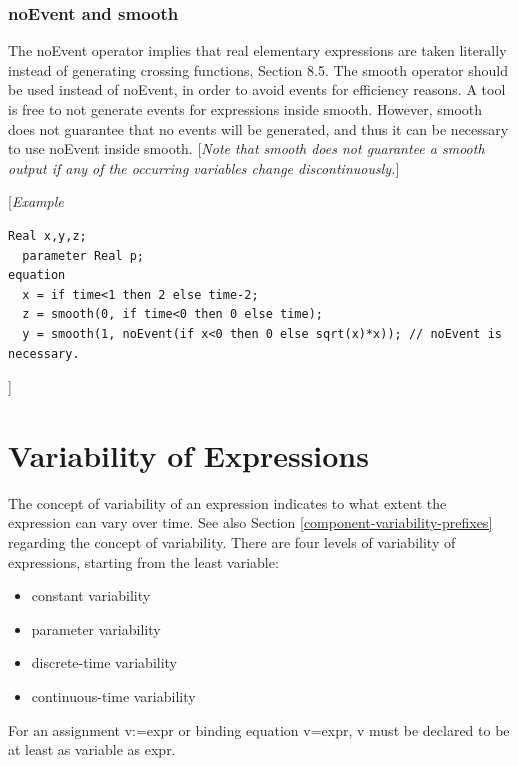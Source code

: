 \documentclass[10pt,a4paper]{report}
\def\Mcomment#1{{[}\emph{#1}{]}}
\def\Mcommentbegin#1{{[}\emph{#1}}
\def\Mcommentend#1{\emph{#1}{]}}
\def\doublelabel#1{\label{#1}\hypertarget{#1}{}}
\begin{document}
\subsubsection{noEvent and smooth}\doublelabel{noevent-and-smooth}

The noEvent operator implies that real elementary expressions are taken
literally instead of generating crossing functions, Section 8.5. The
smooth operator should be used instead of noEvent, in order to avoid
events for efficiency reasons. A tool is free to not generate events for
expressions inside smooth. However, smooth does not guarantee that no
events will be generated, and thus it can be necessary to use noEvent
inside smooth. \Mcomment{Note that \emph{smooth} does not guarantee a
smooth output if any of the occurring variables change
discontinuously.}

\Mcommentbegin{Example}
\begin{lstlisting}[language=modelica]
  Real x,y,z;
  parameter Real p;
equation
  x = if time<1 then 2 else time-2;
  z = smooth(0, if time<0 then 0 else time);
  y = smooth(1, noEvent(if x<0 then 0 else sqrt(x)*x)); // noEvent is necessary.
\end{lstlisting}
\Mcommentend{}

\section{Variability of Expressions}\doublelabel{variability-of-expressions}

The concept of variability of an expression indicates to what extent the
expression can vary over time. See also Section \ref{component-variability-prefixes} regarding the
concept of variability. There are four levels of variability of
expressions, starting from the least variable:

\begin{itemize}
\item
  constant variability
\end{itemize}

\begin{itemize}
\item
  parameter variability
\item
  discrete-time variability
\item
  continuous-time variability
\end{itemize}

For an assignment v:=expr or binding equation v=expr, v must be declared
to be at least as variable as expr.
\end{document}
